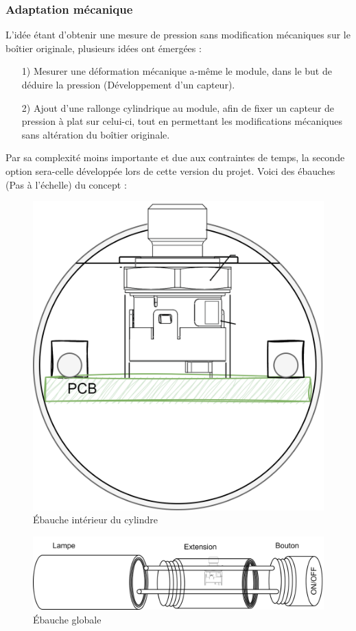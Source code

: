 {	\subsubsection{Adaptation mécanique} \label{sssec:MecAdapt}
	{	
		L'idée étant d'obtenir une mesure de pression sans modification mécaniques sur le boîtier originale, plusieurs idées ont émergées :
		\begin{itemize}
			\item[1)] Mesurer une déformation mécanique a-même le module, dans le but de déduire la pression (Développement d'un capteur).
			\item[2)] Ajout d'une rallonge cylindrique au module, afin de fixer un capteur de pression à plat sur celui-ci, tout en permettant les modifications mécaniques sans altération du boîtier originale.
		\end{itemize}
		Par sa complexité moins importante et due aux contraintes de temps, la seconde option sera-celle développée lors de cette version du projet.
		Voici des ébauches (Pas à l'échelle) du concept : 
		\begin{figure}[h]
			\centering
			\includegraphics[width=0.45\linewidth]{Figures/Dev-SCH/MecaniqueProto1}
			\caption{Ébauche intérieur du cylindre}
			\label{fig:mecaniqueproto1}
		\end{figure}\vspace{-5mm}
		\begin{figure}[!h]
			\centering
			\includegraphics[width=0.75\linewidth]{Figures/Dev-SCH/MecaniqueProto2}
			\caption{Ébauche globale}
			\label{fig:mecaniqueproto2}
		\end{figure}
		
}}

